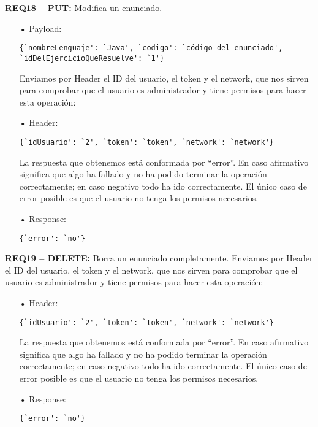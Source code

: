\textbf{REQ18 – PUT:} Modifica un enunciado.
\begin{itemize}
\item[•]
Payload: 
{\codesize
\begin{verbatim}
{`nombreLenguaje': `Java', `codigo': `código del enunciado', 
`idDelEjercicioQueResuelve': `1'}
\end{verbatim}
}

Enviamos por Header el ID del usuario, el token y el network, que nos sirven para comprobar que el usuario es administrador y tiene permisos para hacer esta operación:
\item[•]
Header: 
{\codesize
\begin{verbatim}
{`idUsuario': `2', `token': `token', `network': `network'}
\end{verbatim}
}

La respuesta que obtenemos está conformada por ``error''. En caso afirmativo significa que algo ha fallado y no ha podido terminar la operación correctamente; en caso negativo todo ha ido correctamente. El único caso de error posible es que el usuario no tenga los permisos necesarios.
\item[•]
Response: 
{\codesize
\begin{verbatim}
{`error': `no'}
\end{verbatim}
}
\end{itemize}

\textbf{REQ19 – DELETE:} Borra un enunciado completamente. Enviamos por Header el ID del usuario, el token y el network, que nos sirven para comprobar que el usuario es administrador y tiene permisos para hacer esta operación:
\begin{itemize}
\item[•]
Header:
{\codesize
\begin{verbatim} 
{`idUsuario': `2', `token': `token', `network': `network'}
\end{verbatim}
}

La respuesta que obtenemos está conformada por ``error''. En caso afirmativo significa que algo ha fallado y no ha podido terminar la operación correctamente; en caso negativo todo ha ido correctamente. El único caso de error posible es que el usuario no tenga los permisos necesarios.
\item[•]
Response: 
{\codesize
\begin{verbatim}
{`error': `no'}
\end{verbatim}
}
\end{itemize}

